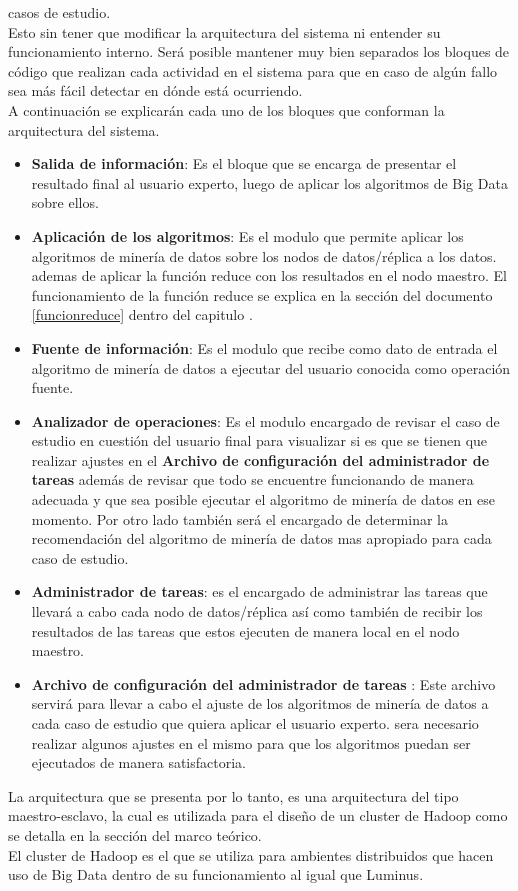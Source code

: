 casos de estudio. 
\\
Esto sin tener que modificar la arquitectura del sistema ni entender su funcionamiento interno. Será posible
mantener muy bien separados los bloques de código que realizan cada actividad en el sistema para que en caso de algún fallo sea
más fácil detectar en dónde está ocurriendo.
\\
A continuación se explicarán cada uno de los bloques que conforman la arquitectura del sistema.
\begin{itemize}
	\item \textbf{Salida de información}: Es el bloque que se encarga de presentar el resultado final al usuario experto, luego de aplicar los algoritmos de Big Data sobre ellos.
	\item \textbf{Aplicación de los algoritmos}: Es el modulo que permite aplicar los algoritmos de minería de datos sobre los nodos de datos/réplica a los datos. ademas de aplicar la función reduce con los resultados en el nodo maestro.
	El funcionamiento de la función reduce se explica en la sección del documento \ref{funcionreduce} dentro del capitulo .
	\item \textbf{Fuente de información}: Es el modulo que recibe como dato de entrada el algoritmo de minería de datos a ejecutar del usuario conocida como operación fuente.
	\item \textbf{Analizador de operaciones}: Es el modulo encargado de revisar el caso de estudio en cuestión del usuario final para visualizar si es que se tienen que realizar ajustes en el \textbf{Archivo de configuración del administrador de tareas} además de revisar que todo se encuentre funcionando de manera adecuada y que sea posible ejecutar el algoritmo de minería de datos en ese momento.
	Por otro lado también será el encargado de determinar la recomendación del algoritmo de minería de datos mas apropiado para cada caso de estudio.
	\item \textbf{Administrador de tareas}: es el encargado de administrar las tareas que llevará a cabo cada nodo de datos/réplica así como también de recibir los resultados de las tareas que estos ejecuten de manera local en el nodo maestro.
	\item \textbf{Archivo de configuración del administrador de tareas }: Este archivo servirá para llevar a cabo el ajuste de los algoritmos de minería de datos a cada caso de estudio que quiera aplicar el usuario experto. sera necesario realizar algunos ajustes en el mismo para que los algoritmos puedan ser ejecutados de manera satisfactoria.
\end{itemize}
La arquitectura que se presenta por lo tanto, es una arquitectura del tipo maestro-esclavo, la cual es utilizada para el diseño de un cluster de Hadoop como se detalla en la sección  del marco teórico. 
\\
El cluster de Hadoop es el que se utiliza para ambientes distribuidos que hacen uso de Big Data dentro de su funcionamiento al igual que Luminus.  